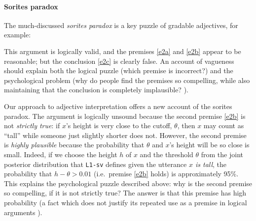 \documentclass[12pt]{article}
\begin{document}
\paragraph{Sorites paradox} The much-discussed \emph{sorites paradox} is a key puzzle of gradable adjectives, for example:
\begin{exe}
\begin{xlist}
\end{xlist}
\end{exe}
This argument is logically valid, and the premises \ref{e2a} and \ref{e2b} appear to be reasonable; but the conclusion \ref{e2c} is clearly false. An account of vagueness should explain both the logical puzzle (which premise is incorrect?) and the psychological problem (why do people find the premises so compelling, while also maintaining that the conclusion is completely implausible? \cite[Cf.][]{fara00}).

Our approach to adjective interpretation offers a new account of the sorites paradox. The argument is logically unsound because the second premise \ref{e2b} is not \emph{strictly true}: if $x$'s height is very close to the cutoff, $\theta$, then $x$ may count as ``tall'' while someone just slightly shorter does not. However, the second premise is  \emph{highly plausible} because the probability that $\theta$ and $x$'s height will be so close is small. 
Indeed, if we choose the height $h$ of $x$ and the threshold $\theta$ from the joint posterior distribution that \lstinline{L1-sv} defines given the utterance \emph{$x$ is tall},
the probability that $h - \theta > 0.01$ (i.e.~premise \ref{e2b} holds) is approximately 95\%.
This explains the psychological puzzle described above: why is the second premise so compelling, if it is not strictly true? The answer is that this premise has high probability (a fact which does not justify its repeated use as a premise in logical arguments \cite{kyburg61}).
\end{document}
